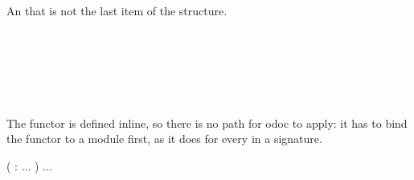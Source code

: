 \\
\label{Oxcaml_impl--module-Include_functor_not_last}\label{Oxcaml_impl-Include_functor_not_last}\begin{ocamlindent}\label{Oxcaml_impl-Include_functor_not_last--module-Make}\begin{ocamlindent}An  that is not the last item of the structure.\end{ocamlindent}%
\medbreak
\label{Oxcaml_impl-Include_functor_not_last--type-t}\\
 \hyperref[Oxcaml_impl-Include_functor_not_last-Make]{}\label{Oxcaml_impl-Include_functor_not_last--type-included}\\
\label{Oxcaml_impl-Include_functor_not_last--type-after}\\
\end{ocamlindent}%
\\
\label{Oxcaml_impl--module-Anonymous_functor}\label{Oxcaml_impl-Anonymous_functor}\begin{ocamlindent}\label{Oxcaml_impl-Anonymous_functor--type-t}\begin{ocamlindent}The functor is defined inline, so there is no path for odoc to apply: it has to bind the functor to a module first, as it does for every  in a signature.\end{ocamlindent}%
\medbreak
{}  (\hyperref[Oxcaml_impl-Anonymous_functor-argument-1-T]{} :  .\allowbreak{}.\allowbreak{}.\allowbreak{} )   .\allowbreak{}.\allowbreak{}.\allowbreak{} \label{Oxcaml_impl-Anonymous_functor--type-included}\\
\end{ocamlindent}%
